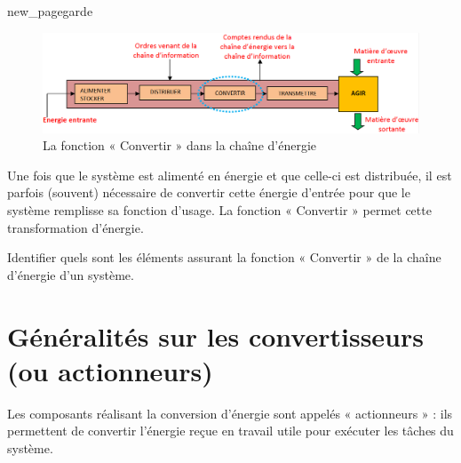 \documentclass[10pt,fleqn]{article} %
\begin{document}
{new_pagegarde}

\begin{figure}[h]
  \includegraphics[width=\textwidth]{images/S03_C03}
  \caption{La fonction « Convertir » dans la chaîne d'énergie}
  \label{fig:chaine}
\end{figure}

Une fois que le système est alimenté en énergie et que celle-ci est distribuée, il est parfois (souvent) nécessaire de convertir cette énergie d’entrée pour que le système remplisse sa fonction d’usage.
La fonction « Convertir » permet cette transformation d’énergie.

\begin{obj}
  Identifier quels sont les éléments assurant la fonction « Convertir » de la chaîne d’énergie d’un système.
\end{obj}

\section{Généralités sur les convertisseurs (ou actionneurs)}
\begin{definition}
  Les composants réalisant la conversion d’énergie sont appelés « actionneurs » : ils permettent de convertir l'énergie reçue en travail utile pour exécuter les tâches du système.
\end{definition}
\end{document}
